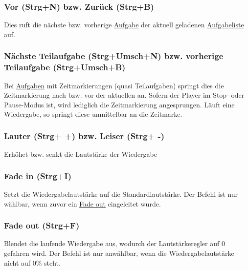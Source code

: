 \documentclass[a4paper,DIV=11
]{scrartcl}
\begin{document}
\hypertarget{vor-strgn-bzw-zuruxfcck-strgb}{%
\subsubsection{Vor (Strg+N) bzw. Zurück
(Strg+B)}\label{vor-strgn-bzw-zuruxfcck-strgb}}

Dies ruft die nächste bzw. vorherige
\protect\hyperlink{aufgabendateien}{Aufgabe} der aktuell geladenen
\protect\hyperlink{aufgabenlisten}{Aufgabeliste} auf.

\hypertarget{nuxe4chste-teilaufgabe-strgumschn-bzw-vorherige-teilaufgabe-strgumschb}{%
\subsubsection{Nächste Teilaufgabe (Strg+Umsch+N) bzw. vorherige
Teilaufgabe
(Strg+Umsch+B)}\label{nuxe4chste-teilaufgabe-strgumschn-bzw-vorherige-teilaufgabe-strgumschb}}

Bei \protect\hyperlink{aufgabendateien}{Aufgaben} mit Zeitmarkierungen
(quasi Teilaufgaben) springt dies die Zeitmarkierung nach bzw. vor der
aktuellen an. Sofern der Player im Stop- oder Pause-Modus ist, wird
lediglich die Zeitmarkierung angesprungen. Läuft eine Wiedergabe, so
springt diese unmittelbar an die Zeitmarke.

\hypertarget{lauter-strg--bzw-leiser-strg--}{%
\subsubsection{Lauter (Strg+ +) bzw. Leiser (Strg+
-)}\label{lauter-strg--bzw-leiser-strg--}}

Erhöhet bzw. senkt die Lautstärke der Wiedergabe

\hypertarget{fade-in-strgi}{%
\subsubsection{Fade in (Strg+I)}\label{fade-in-strgi}}

Setzt die Wiedergabelautstärke auf die Standardlautstärke. Der Befehl
ist nur wählbar, wenn zuvor ein \protect\hyperlink{FadeOut}{Fade out}
eingeleitet wurde.

\hypertarget{fade-out-strgf}{%
\subsubsection{Fade out (Strg+F)}\label{fade-out-strgf}}

Blendet die laufende Wiedergabe aus, wodurch der Lautstärkeregler auf 0
gefahren wird. Der Befehl ist nur anwählbar, wenn die
Wiedergabelautstärke nicht auf 0\% steht.
\end{document}
